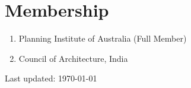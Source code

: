 \documentclass[a4paper,11pt]{article}
\begin{document}
\section{Membership}
\begin{enumerate}
    \item Planning Institute of Australia (Full Member)
    \item Council of Architecture, India
\end{enumerate}

\vspace{2pt}
{\footnotesize Last updated: \today}
\end{document}
